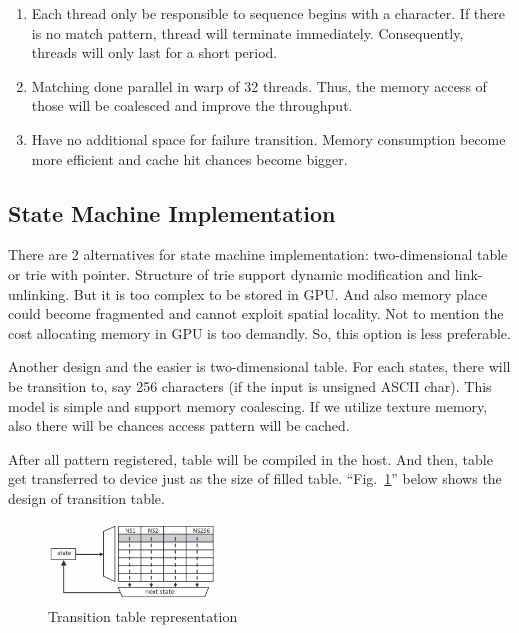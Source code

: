 \documentclass[conference]{IEEEtran}
\begin{document}
        \begin{enumerate}
            \item Each thread only be responsible to sequence begins with a character. If there is no match pattern, thread will terminate immediately. Consequently, threads will only last for a short period.

            \item Matching done parallel in warp of 32 threads. Thus, the memory access of those will be coalesced and improve the throughput.

            \item Have no additional space for failure transition. Memory consumption become more efficient and cache hit chances become bigger.
        \end{enumerate}


    \subsection{State Machine Implementation}
        There are 2 alternatives for state machine implementation: two-dimensional table or trie with pointer. Structure of trie support dynamic modification and link-unlinking. But it is too complex to be stored in GPU. And also memory place could become fragmented and cannot exploit spatial locality. Not to mention the cost allocating memory in GPU is too demandly. So, this option is less preferable. 

        Another design and the easier is two-dimensional table. For each states, there will be transition to, say 256 characters (if the input is unsigned ASCII char). This model is simple and support memory coalescing. If we utilize texture memory, also there will be chances access pattern will be cached.

        After all pattern registered, table will be compiled in the host. And then, table get transferred to device just as the size of filled table. ``Fig.~\ref{table}'' below shows the design of transition table.

    \begin{figure}[htbp]
        \centerline{\includegraphics[width=0.4\textwidth]{../src/resources/table.png}}
        \caption{Transition table representation}
        \label{table}
    \end{figure}
\end{document}
